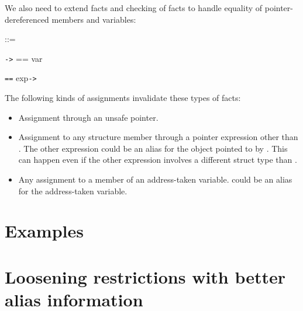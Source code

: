 We also need to extend facts and checking of facts to handle equality of
pointer-dereferenced members and variables:

 ::=

\texttt{-\textgreater{}} == var

 \texttt{==} exp\texttt{-\textgreater{}}

The following kinds of assignments invalidate these types of facts:

\begin{itemize}
\item
  Assignment through an unsafe pointer.
\item
  Assignment to any structure member through a pointer expression other
  than . The other expression could be an alias for the object
  pointed to by . This can happen even if the other expression
  involves a different struct type than .
\item
  Any assignment to a member of an address-taken variable. 
  could be an alias for the address-taken variable.
\end{itemize}

\section{Examples}\label{examples-1}
\section{Loosening restrictions with better alias information}\label{loosening-restrictions-with-better-alias-information}